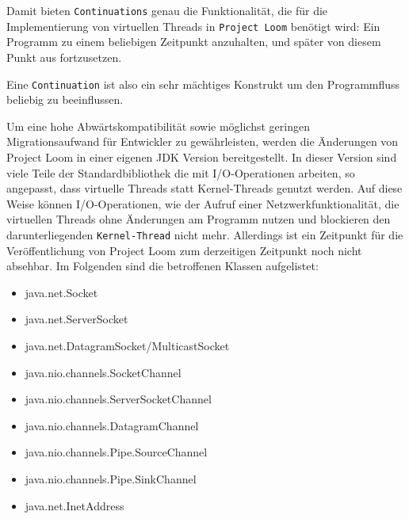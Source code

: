 Damit bieten \verb|Continuations| genau die Funktionalität, die für die Implementierung von virtuellen Threads in \verb|Project Loom| benötigt wird:
Ein Programm zu einem beliebigen Zeitpunkt anzuhalten, und später von diesem Punkt aus fortzusetzen.

Eine \verb|Continuation| ist also ein sehr mächtiges Konstrukt um den Programmfluss beliebig zu beeinflussen.

Um eine hohe Abwärtskompatibilität sowie möglichst geringen Migrationsaufwand für Entwickler zu gewährleisten, werden die Änderungen von
Project Loom in einer eigenen JDK Version bereitgestellt.
In dieser Version sind viele Teile der Standardbibliothek die mit I/O-Operationen arbeiten, so angepasst, dass virtuelle Threads statt Kernel-Threads
genutzt werden. Auf diese Weise können I/O-Operationen, wie der Aufruf einer Netzwerkfunktionalität, die virtuellen Threads ohne Änderungen am Programm nutzen
und blockieren den darunterliegenden \verb|Kernel-Thread| nicht mehr.
Allerdings ist ein Zeitpunkt für die Veröffentlichung von Project Loom zum derzeitigen Zeitpunkt noch nicht absehbar.
Im Folgenden sind die betroffenen Klassen aufgelistet:\parencite{Oracle2021-Loom}

\begin{itemize}
  \item java.net.Socket
  \item java.net.ServerSocket
  \item java.net.DatagramSocket/MulticastSocket
  \item java.nio.channels.SocketChannel
  \item java.nio.channels.ServerSocketChannel
  \item java.nio.channels.DatagramChannel
  \item java.nio.channels.Pipe.SourceChannel
  \item java.nio.channels.Pipe.SinkChannel
  \item java.net.InetAddress
\end{itemize}